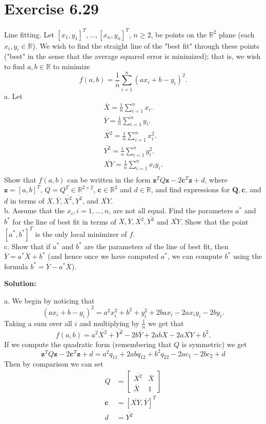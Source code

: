 \documentclass{article}
\newcommand{\bld}[1]{\boldsymbol{#1}}
\begin{document}
\section*{Exercise 6.29}
Line fitting. Let $[x_1,y_1]^T,\dots,[x_n,y_n]^T$, $n\geq 2$, be points on the
$\mathbb{R}^2$ plane (each $x_i,y_i\in \mathbb{R}$). We wish to find the
straight line of the "best fit" through these points ("best" in the sense that
the average squared error is minimized); that is, we wish to find $a,b\in
\mathbb{R}$ to minimize
\[
	f(a,b)=\frac{1}{n} \sum_{i=1}^n(ax_i+b-y_i)^2.
\]
a. Let
\begin{align*}
	\overline{X}=\frac{1}{n}\sum_{i=1}^n x_i.\\
	\overline{Y}=\frac{1}{n}\sum_{i=1}^n y_i.\\
	\overline{X^2}=\frac{1}{n}\sum_{i=1}^n x_i^2.\\
	\overline{Y^2}=\frac{1}{n}\sum_{i=1}^n y_i^2.\\
	\overline{XY}=\frac{1}{n}\sum_{i=1}^n x_iy_i.\\
\end{align*}
Show that $f(a,b)$ can be written in the form $\bld{z}^TQ\bld{z} -
2\bld{c}^T\bld{z} + d$, where $\bld{z}=[a,b]^T$, $Q=Q^T\in \mathbb{R}^{2\times
2}$, $\bld{c}\in \mathbb{R}^2$ and $d\in\mathbb{R}$, and find expressions for
$\bld{Q},\bld{c}$, and $d$ in terms of $\overline{X}, \overline{Y},
\overline{X^2}, \overline{Y^2}$, and $\overline{XY}$.\\
b. Assume that the $x_i, i=1,\dots,n$, are not all equal. Find the parameters
$a^*$ and $b^*$ for the line of best fit in terms of
$\overline{X},\overline{Y},\overline{X^2},\overline{Y^2}$ and $\overline{XY}$.
Show that the point $[a^*,b^*]^T$ is the only local minimizer of $f$.\\
c. Show that if $a^*$ and $b^*$ are the parameters of the line of best fit,
then $\overline{Y}=a^*\overline{X}+b^*$ (and hence once we have computed $a^*$,
we can compute $b^*$ using the formula $b^*=\overline{Y}-a^*\overline{X}$).

\textbf{Solution:}

a. We begin by noticing that
\[
(ax_i+b-y_i)^2=a^2x_i^2+b^2+y_i^2+2bax_i-2ax_iy_i-2by_i.
\]
Taking a sum over all $i$ and multiplying by $\frac{1}{n}$ we get that
\[
f(a,b) = a^2\overline{X^2}+ \overline{Y^2}-
2b\overline{Y}+2ab\overline{X} - 2a\overline{XY} + b^2.
\]
If we compute the quadratic form (remembering that $Q$ is symmetric) we get
\[
\bld{z}^TQ\bld{z} - 2\bld{c}^T\bld{z} + d =
a^2q_{11} + 2abq_{12}+b^2q_{22}-2ac_1 -2bc_2 +d
\]
Then by comparison we can set
\begin{align*}
Q&=\begin{bmatrix}
	\overline{X^2} & \overline{X}\\
	\overline{X} & 1
\end{bmatrix}\\
\bld{c}&=[\overline{XY},\overline{Y}]^T\\
d&=\overline{Y^2}
\end{align*}
\end{document}
